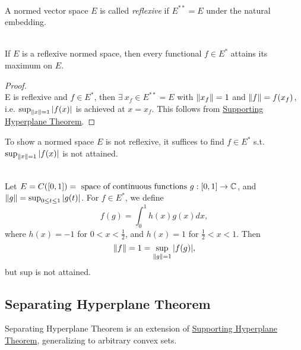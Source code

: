 \begin{definition}[Reflexivity]\ \\
    A normed vector space $E$ is called \textit{reflexive} if $E^{**} = E$ under the natural embedding.
\end{definition}

\begin{proposition}\ \\
If $E$ is a reflexive normed space, then every functional $f \in E^*$ attains its maximum on $E$.
\end{proposition}
\begin{proof}\ \\
E is reflexive and $f \in E^*$, then $\exists\ x_f \in E^{**} = E$ with $\norm{x_f} = 1$ and $\norm{f} = f(x_f)$, i.e. $\sup_{\norm{x} = 1} \abs{f(x)}$ is achieved at $x = x_f$. This follows from \hyperref[SHT]{Supporting Hyperplane Theorem}.
\end{proof}

\np To show a normed space $E$ is not reflexive, it suffices to find $f \in E^*$ s.t. $\sup_{\norm{x} = 1} \abs{f(x)}$ is not attained. 

\begin{example}\ \\
Let $E = C([0,1]) = \text{ space of continuous functions } g: [0,1] \to \mathbb{C}$, and $\norm{g} = \sup_{0 \leq t\leq 1} \abs{g(t)}$. For $f \in E^*$, we define
\begin{equation*}
    f(g) = \int_0^1 h(x) g(x) dx,
\end{equation*}
where $h(x) = -1$ for $0  < x < \frac{1}{2}$, and $h(x) = 1$ for $\frac{1}{2} < x < 1$. Then
\begin{equation*}
    \norm{f} = 1 = \sup_{\norm{g} = 1} \abs{f(g)},
\end{equation*}
but sup is not attained.
\end{example}


\vspace{12pt}
\subsection{Separating Hyperplane Theorem}
\begin{remark}
Separating Hyperplane Theorem is an extension of \hyperref[SHT]{Supporting Hyperplane Theorem}, generalizing to arbitrary convex sets.
\end{remark}

